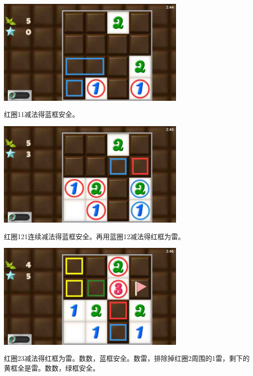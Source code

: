 \subsection{} %
\begin{center}
    \includegraphics[width=0.7\textwidth]{puzzlelow/33-1.jpg}
\end{center}
红圈11减法得蓝框安全。
\begin{center}
    \includegraphics[width=0.7\textwidth]{puzzlelow/33-2.jpg}
\end{center}
红圈121连续减法得蓝框安全。再用蓝圈12减法得红框为雷。
\begin{center}
    \includegraphics[width=0.7\textwidth]{puzzlelow/33-3.jpg}
\end{center}
红圈23减法得红框为雷。数数，蓝框安全。数雷，排除掉红圈2周围的1雷，剩下的黄框全是雷。数数，绿框安全。

